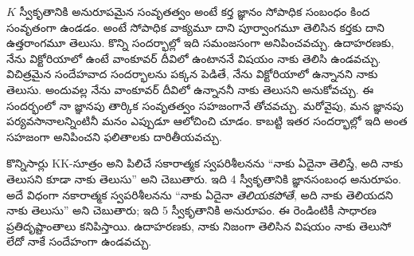 \documentclass[../../../include/open-logic-section]{subfiles}
\begin{document}
$K$ స్వీకృతానికి అనురూపమైన సంవృతత్వం అంటే కర్త జ్ఞానం సోపాధిక సంబంధం కింద సంవృతంగా ఉండడం.
అంటే సోపాధిక వాక్యమూ దాని పూర్వాంగమూ తెలిసిన కర్తకు
దాని ఉత్తరాంగమూ తెలుసు. కొన్ని సందర్భాల్లో ఇది సమంజసంగా
అనిపించవచ్చు. ఉదాహరణకు, నేను విక్టోరియాలో ఉంటే
వాంకూవర్ దీవిలో ఉంటాననే విషయం నాకు తెలిసి ఉండవచ్చు.
విచిత్రమైన సందేహవాద సందర్భాలను పక్కన పెడితే,
నేను విక్టోరియాలో ఉన్నానని నాకు తెలుసు. అందువల్ల
నేను వాంకూవర్ దీవిలో ఉన్నాననీ నాకు తెలుసని అనుకోవచ్చు.
ఈ సందర్భంలో నా జ్ఞానపు తార్కిక సంవృతత్వం
సహజంగానే తోచవచ్చు. మరోవైపు,
మన జ్ఞానపు పర్యవసానాలన్నింటినీ మనం ఎప్పుడూ
ఆలోచించి చూడం. కాబట్టి ఇతర సందర్భాల్లో ఇది
అంత సహజంగా అనిపించని ఫలితాలకు దారితీయవచ్చు.

కొన్నిసార్లు KK-సూత్రం అని పిలిచే సకారాత్మక
స్వపరిశీలనను ``నాకు ఏదైనా తెలిస్తే, అది నాకు
తెలుసని కూడా నాకు తెలుసు'' అని చెబుతారు.
ఇది 4 స్వీకృతానికి జ్ఞానసంబంధ అనురూపం.
అదే విధంగా నకారాత్మక స్వపరిశీలనను ``నాకు
ఏదైనా \emph{తెలియకపోతే}, అది నాకు తెలియదని
నాకు తెలుసు'' అని చెబుతారు; ఇది 5 స్వీకృతానికి
అనురూపం. ఈ రెండింటికీ సాధారణ ప్రతిదృష్టాంతాలు కనిపిస్తాయి. ఉదాహరణకు, నాకు నిజంగా తెలిసిన
విషయం నాకు తెలుసో లేదో నాకే సందేహంగా ఉండవచ్చు.
\end{document}
